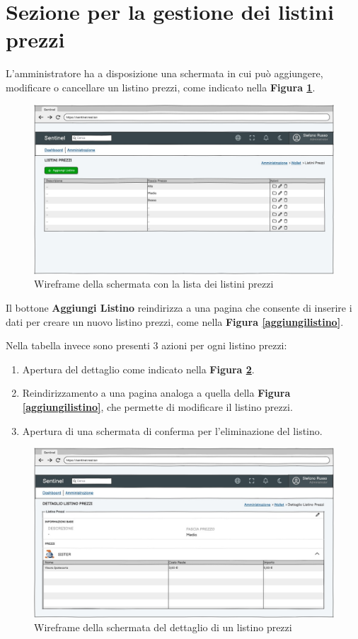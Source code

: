 \section{Sezione per la gestione dei listini prezzi}
L'amministratore ha a disposizione una schermata in cui pu\`o aggiungere, modificare o cancellare un listino prezzi, come indicato nella \textbf{Figura \ref{listalistini}}.
\begin{figure}[H]
  \centering
  \includegraphics[width=12cm]{images/gestione-listini/listini-prezzi-list.png}
  \caption{Wireframe della schermata con la lista dei listini prezzi}
  \label{listalistini}
\end{figure}
Il bottone \textbf{Aggiungi Listino} reindirizza a una pagina che consente di inserire i dati per creare un nuovo listino prezzi, come nella \textbf{Figura \ref{aggiungilistino}}.

Nella tabella invece sono presenti 3 azioni per ogni listino prezzi:
\begin{enumerate}
  \item Apertura del dettaglio come indicato nella \textbf{Figura \ref{dettagliolistino}}.
  \item Reindirizzamento a una pagina analoga a quella della \textbf{Figura \ref{aggiungilistino}}, che permette di modificare il listino prezzi.
  \item Apertura di una schermata di conferma per l'eliminazione del listino.
\end{enumerate}

\begin{figure}[H]
  \centering
  \includegraphics[width=12cm]{images/gestione-listini/dettaglio-listino.png}
  \caption{Wireframe della schermata del dettaglio di un listino prezzi}
  \label{dettagliolistino}
\end{figure}

